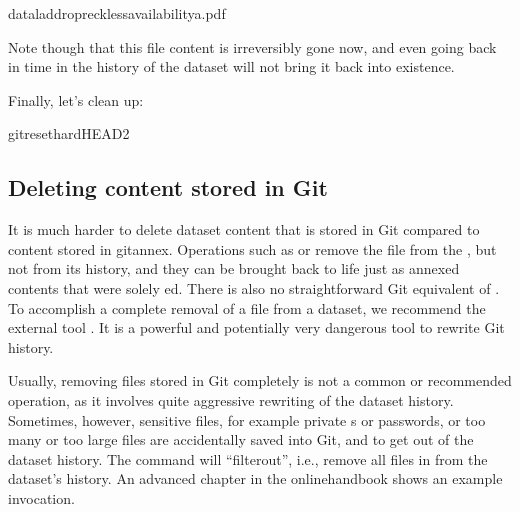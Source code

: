 \begin{sphinxVerbatim}[commandchars=\\\{\}]
dataladdrop\PYGZhy{}\PYGZhy{}recklessavailabilitya.pdf
\end{sphinxVerbatim}

\sphinxAtStartPar
Note though that this file content is irreversibly gone now, and
even going back in time in the history of the dataset will not bring it
back into existence.

\sphinxAtStartPar
Finally, let’s clean up:

\begin{sphinxVerbatim}[commandchars=\\\{\}]
gitreset\PYGZhy{}\PYGZhy{}hardHEAD\PYGZti{}2
\end{sphinxVerbatim}


\subsection{Deleting content stored in Git}
\label{\detokenize{basics/101-136-filesystem:deleting-content-stored-in-git}}
\sphinxAtStartPar
It is much harder to delete dataset content that is stored in Git compared to
content stored in git\sphinxhyphen{}annex.
Operations such as  or  remove the file from the ,
but not from its history, and they can be brought back to life just as annexed
contents that were solely \textquotesingle{}ed. There is also no straightforward
Git equivalent of .
To accomplish a complete removal of a file from a dataset, we recommend the external tool
.
It is a powerful and potentially very dangerous tool to rewrite Git history.

\sphinxAtStartPar
Usually, removing files stored in Git completely
is not a common or recommended operation, as it involves quite aggressive
rewriting of the dataset history. Sometimes, however, sensitive files, for example
private {\hyperref[\detokenize{glossary:term-SSH-key}]{}}s or passwords, or too many or too large files are
accidentally saved into Git, and  to get out of the dataset history.
The command  will “filter\sphinxhyphen{}out”,
i.e., remove all files  in 
from the dataset’s history. An advanced chapter in the online\sphinxhyphen{}handbook
shows an example invocation.


